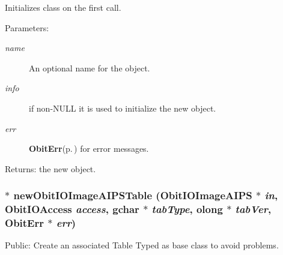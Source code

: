 Initializes class on the first call. \begin{Desc}
\item[Parameters:]
\begin{description}
\item[{\em name}]An optional name for the object. \item[{\em info}]if non-NULL it is used to initialize the new object. \item[{\em err}]{\bf Obit\-Err}{\rm (p.\,\pageref{structObitErr})} for error messages. \end{description}
\end{Desc}
\begin{Desc}
\item[Returns:]the new object. \end{Desc}
\subsubsection{$\ast$ new\-Obit\-IOImage\-AIPSTable ({\bf Obit\-IOImage\-AIPS} $\ast$ {\em in}, Obit\-IOAccess {\em access}, gchar $\ast$ {\em tab\-Type}, {\bf olong} $\ast$ {\em tab\-Ver}, {\bf Obit\-Err} $\ast$ {\em err})}\label{ObitIOImageAIPS_8c_a21}


Public: Create an associated Table Typed as base class to avoid problems. 

